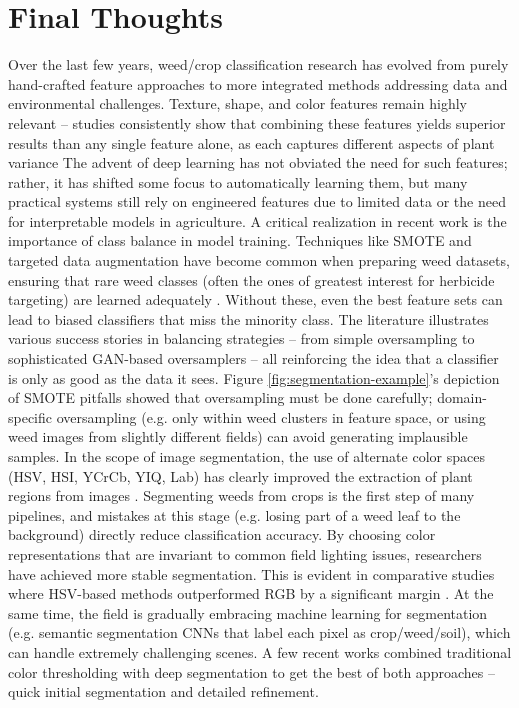\documentclass[letterpaper]{report}
\begin{document}
\section{Final Thoughts} 
Over the last few years, weed/crop classification research has evolved from purely hand-crafted feature approaches to more integrated methods addressing data and environmental challenges. Texture, shape, and color features remain highly relevant – studies consistently show that combining these features yields superior results than any single feature alone, as each captures different aspects of plant variance  The advent of deep learning has not obviated the need for such features; rather, it has shifted some focus to automatically learning them, but many practical systems still rely on engineered features due to limited data or the need for interpretable models in agriculture.  
%
A critical realization in recent work is the importance of class balance in model training. Techniques like SMOTE and targeted data augmentation have become common when preparing weed datasets, ensuring that rare weed classes (often the ones of greatest interest for herbicide targeting) are learned adequately \parencite{Ahsen2024-tr, Bazrafkan2024-bl}. Without these, even the best feature sets can lead to biased classifiers that miss the minority class. The literature illustrates various success stories in balancing strategies – from simple oversampling to sophisticated GAN-based oversamplers – all reinforcing the idea that a classifier is only as good as the data it sees. Figure  \ref{fig:segmentation-example}’s depiction of SMOTE pitfalls showed that oversampling must be done carefully; domain-specific oversampling (e.g. only within weed clusters in feature space, or using weed images from slightly different fields) can avoid generating implausible samples.  
%
In the scope of image segmentation, the use of alternate color spaces (HSV, HSI, YCrCb, YIQ, Lab) has clearly improved the extraction of plant regions from images  \parencite{Wu2021-gt}. Segmenting weeds from crops is the first step of many pipelines, and mistakes at this stage (e.g. losing part of a weed leaf to the background) directly reduce classification accuracy. By choosing color representations that are invariant to common field lighting issues, researchers have achieved more stable segmentation. This is evident in comparative studies where HSV-based methods outperformed RGB by a significant margin \parencite{Priya2019-zw}. At the same time, the field is gradually embracing machine learning for segmentation (e.g. semantic segmentation CNNs that label each pixel as crop/weed/soil), which can handle extremely challenging scenes. A few recent works combined traditional color thresholding with deep segmentation to get the best of both approaches – quick initial segmentation and detailed refinement.  
\end{document}
